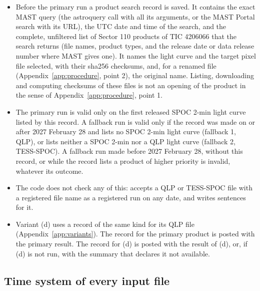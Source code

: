 \begin{itemize}
\item Before the primary run a product search record is saved. It contains the exact MAST query (the astroquery call
  with all its arguments, or the MAST Portal search with its URL), the UTC date and time of the search, and the
  complete, unfiltered list of Sector 110 products of TIC 4206066 that the search returns (file names, product types,
  and the release date or data release number where MAST gives one). It names the light curve and the target pixel
  file selected, with their sha256 checksums, and, for a renamed file (Appendix~\ref{app:procedure}, point 2), the
  original name. Listing, downloading and computing checksums of these files is not an opening of the product in the
  sense of Appendix~\ref{app:procedure}, point 1.
\item The primary run is valid only on the first released SPOC 2-min light curve listed by this record. A fallback run
  is valid only if the record was made on or after 2027 February 28 and lists no SPOC 2-min light curve (fallback 1,
  QLP), or lists neither a SPOC 2-min nor a QLP light curve (fallback 2, TESS-SPOC). A fallback run made before
  2027 February 28, without this record, or while the record lists a product of higher priority is invalid, whatever
  its outcome.
\item The code does not check any of this:  accepts a QLP or TESS-SPOC file with a registered file
  name as a registered run on any date, and  writes sentences for it.
\item Variant (d) uses a record of the same kind for its QLP file (Appendix~\ref{app:variants}). The record for the
  primary product is posted with the primary result. The record for (d) is posted with the result of (d), or, if (d) is
  not run, with the summary that declares it not available.
\end{itemize}

\subsection{Time system of every input file} \label{app:p3}

